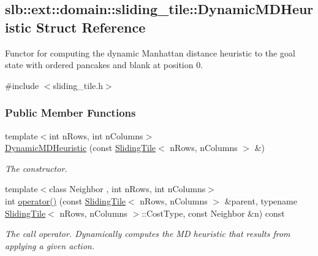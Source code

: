 \hypertarget{structslb_1_1ext_1_1domain_1_1sliding__tile_1_1DynamicMDHeuristic}{}\subsection{slb\+:\+:ext\+:\+:domain\+:\+:sliding\+\_\+tile\+:\+:Dynamic\+M\+D\+Heuristic Struct Reference}
\label{structslb_1_1ext_1_1domain_1_1sliding__tile_1_1DynamicMDHeuristic}


Functor for computing the dynamic Manhattan distance heuristic to the goal state with ordered pancakes and blank at position 0.  




{\ttfamily \#include $<$sliding\+\_\+tile.\+h$>$}

\subsubsection*{Public Member Functions}
\begin{DoxyCompactItemize}
\item 
{\footnotesize template$<$int n\+Rows, int n\+Columns$>$ }\\\hyperlink{structslb_1_1ext_1_1domain_1_1sliding__tile_1_1DynamicMDHeuristic_a5404b91da8e8562fbabe43e0a57d1ab6}{Dynamic\+M\+D\+Heuristic} (const \hyperlink{structslb_1_1ext_1_1domain_1_1sliding__tile_1_1SlidingTile}{Sliding\+Tile}$<$ n\+Rows, n\+Columns $>$ \&)\hypertarget{structslb_1_1ext_1_1domain_1_1sliding__tile_1_1DynamicMDHeuristic_a5404b91da8e8562fbabe43e0a57d1ab6}{}\label{structslb_1_1ext_1_1domain_1_1sliding__tile_1_1DynamicMDHeuristic_a5404b91da8e8562fbabe43e0a57d1ab6}

\begin{DoxyCompactList}\small\item\em The constructor. \end{DoxyCompactList}\item 
{\footnotesize template$<$class Neighbor , int n\+Rows, int n\+Columns$>$ }\\int \hyperlink{structslb_1_1ext_1_1domain_1_1sliding__tile_1_1DynamicMDHeuristic_ae0da625d0d9acb7d69b739d94a2fccab}{operator()} (const \hyperlink{structslb_1_1ext_1_1domain_1_1sliding__tile_1_1SlidingTile}{Sliding\+Tile}$<$ n\+Rows, n\+Columns $>$ \&parent, typename \hyperlink{structslb_1_1ext_1_1domain_1_1sliding__tile_1_1SlidingTile}{Sliding\+Tile}$<$ n\+Rows, n\+Columns $>$\+::Cost\+Type, const Neighbor \&n) const 
\begin{DoxyCompactList}\small\item\em The call operator. Dynamically computes the MD heuristic that results from applying a given action. \end{DoxyCompactList}\end{DoxyCompactItemize}



